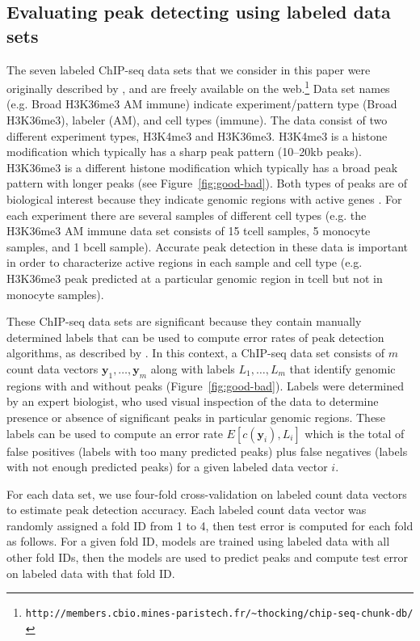 \documentclass[aoas]{imsart}
\begin{document}
\subsection{Evaluating peak detecting using labeled data sets}

The seven labeled ChIP-seq data sets that we consider in this paper were originally
described by \citet{HOCKING2016-chipseq}, and are freely available on
the
web.\footnote{\verb|http://members.cbio.mines-paristech.fr/~thocking/chip-seq-chunk-db/|}
Data set names (e.g. Broad H3K36me3 AM immune) indicate
experiment/pattern type (Broad H3K36me3), labeler (AM), and cell types
(immune). The data consist of two different experiment types, H3K4me3
and H3K36me3. H3K4me3 is a histone modification which typically has a
sharp peak pattern (10--20kb peaks). H3K36me3 is a different histone
modification which typically has a broad peak pattern with longer
peaks (see Figure~\ref{fig:good-bad}). Both types of peaks are of
biological interest because they indicate genomic regions with active
genes \citep{histone-review}. For each experiment there are several samples of different
cell types (e.g. the H3K36me3 AM immune data set consists of 15 tcell
samples, 5 monocyte samples, and 1 bcell sample). Accurate peak
detection in these data is important in order to characterize active
regions in each sample and cell type (e.g. H3K36me3 peak predicted at
a particular genomic region in tcell but not in monocyte samples).

These ChIP-seq data sets are significant
because they contain manually determined labels that can be used to
compute error rates of peak detection algorithms, as described by \citet{HOCKING2016-chipseq}. In this context, a
ChIP-seq data set consists of $m$ count data vectors
$\mathbf y_1,\dots,\mathbf y_m$ along with labels $L_1,\dots, L_m$
that identify genomic regions with and without peaks
(Figure~\ref{fig:good-bad}). Labels were determined by an expert
biologist, who used visual inspection of the data to determine
presence or absence of significant peaks in particular genomic
regions. These labels can be used to compute an error rate
$E[c(\mathbf y_i), L_i]$ which is the total of false positives (labels
with too many predicted peaks) plus false negatives (labels with not
enough predicted peaks) for a given labeled data vector $i$.

For each data set, we use four-fold
cross-validation on labeled count data vectors to estimate peak
detection accuracy. Each labeled count data vector was randomly assigned a fold
ID from 1 to 4, then test error is computed for each fold as follows.
For a given fold ID, models are trained using labeled data with all
other fold IDs, then the models are used to predict peaks and compute
test error on labeled data with that fold ID.
\end{document}
